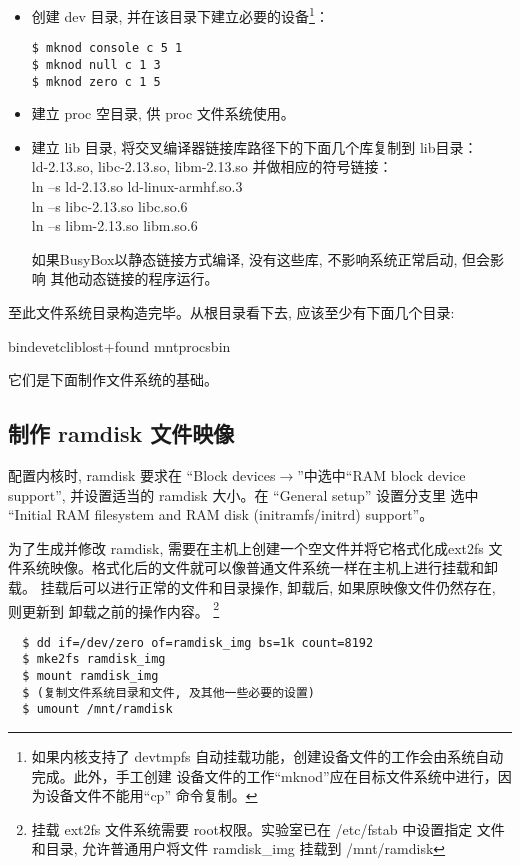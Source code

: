 \begin{itemize}
  \item 创建 dev 目录, 并在该目录下建立必要的设备\footnote{如果内核支持了
devtmpfs 自动挂载功能，创建设备文件的工作会由系统自动完成。此外，手工创建
  设备文件的工作``mknod''应在目标文件系统中进行，因为设备文件不能用``cp''
  命令复制。}：
\begin{verbatim}
$ mknod console c 5 1
$ mknod null c 1 3
$ mknod zero c 1 5
\end{verbatim}

  \item 建立 proc 空目录, 供 proc 文件系统使用。
  \item 建立 lib 目录, 将交叉编译器链接库路径下的下面几个库复制到 lib目录：\\
		ld-2.13.so, libc-2.13.so, libm-2.13.so 并做相应的符号链接：\\
		ln --s ld-2.13.so ld-linux-armhf.so.3\\
		ln --s libc-2.13.so libc.so.6\\
		ln --s libm-2.13.so libm.so.6

		如果BusyBox以静态链接方式编译, 没有这些库, 不影响系统正常启动, 但会影响
		其他动态链接的程序运行。
\end{itemize}

	至此文件系统目录构造完毕。从根目录看下去, 应该至少有下面几个目录:

	bin\qquad  dev\qquad  etc\qquad  lib\qquad lost+found\qquad
	mnt\qquad proc\qquad sbin

    它们是下面制作文件系统的基础。

\subsection{制作 ramdisk 文件映像}
	配置内核时, ramdisk 要求在 ``Block devices$\to$''中选中``RAM block
device support'', 并设置适当的 ramdisk 大小。在 ``General setup'' 设置分支里
选中 ``Initial RAM filesystem and RAM disk (initramfs/initrd) support''。

	为了生成并修改 ramdisk, 需要在主机上创建一个空文件并将它格式化成ext2fs
文件系统映像。格式化后的文件就可以像普通文件系统一样在主机上进行挂载和卸载。
挂载后可以进行正常的文件和目录操作, 卸载后, 如果原映像文件仍然存在, 则更新到
卸载之前的操作内容。
\footnote{ 挂载 ext2fs 文件系统需要 root权限。实验室已在 /etc/fstab 中设置指定
文件和目录, 允许普通用户将文件 ramdisk\_img 挂载到 /mnt/ramdisk}

\begin{boxedminipage}{.9\textwidth}
\begin{verbatim}
  $ dd if=/dev/zero of=ramdisk_img bs=1k count=8192
  $ mke2fs ramdisk_img
  $ mount ramdisk_img
  $ (复制文件系统目录和文件, 及其他一些必要的设置)
  $ umount /mnt/ramdisk
\end{verbatim}
\end{boxedminipage}

